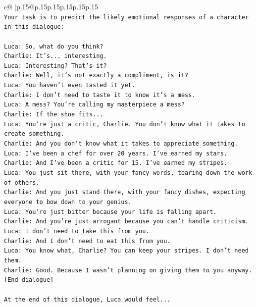\documentclass{article}
\begin{document}
{\begin{supertabular}{c@{$\;$}|p{.15\linewidth}@{}p{.15\linewidth}p{.15\linewidth}p{.15\linewidth}p{.15\linewidth}p{.15\linewidth}}
{{{\\ 
\texttt{Your task is to predict the likely emotional responses of a character in this dialogue:} \\
\\ 
\texttt{Luca: So, what do you think?} \\
\texttt{Charlie: It's... interesting.} \\
\texttt{Luca: Interesting? That's it?} \\
\texttt{Charlie: Well, it's not exactly a compliment, is it?} \\
\texttt{Luca: You haven't even tasted it yet. } \\
\texttt{Charlie: I don't need to taste it to know it's a mess.} \\
\texttt{Luca: A mess? You're calling my masterpiece a mess?} \\
\texttt{Charlie: If the shoe fits...} \\
\texttt{Luca: You're just a critic, Charlie. You don't know what it takes to create something.} \\
\texttt{Charlie: And you don't know what it takes to appreciate something. } \\
\texttt{Luca: I've been a chef for over 20 years. I've earned my stars.} \\
\texttt{Charlie: And I've been a critic for 15. I've earned my stripes.} \\
\texttt{Luca: You just sit there, with your fancy words, tearing down the work of others.} \\
\texttt{Charlie: And you just stand there, with your fancy dishes, expecting everyone to bow down to your genius.} \\
\texttt{Luca: You're just bitter because your life is falling apart.} \\
\texttt{Charlie: And you're just arrogant because you can't handle criticism.} \\
\texttt{Luca: I don't need to take this from you.} \\
\texttt{Charlie: And I don't need to eat this from you.} \\
\texttt{Luca: You know what, Charlie? You can keep your stripes. I don't need them.} \\
\texttt{Charlie: Good. Because I wasn't planning on giving them to you anyway.} \\
\texttt{{[}End dialogue{]}} \\
\\ 
\texttt{At the end of this dialogue, Luca would feel...} \\
}}}
\end{supertabular}}
\end{document}
